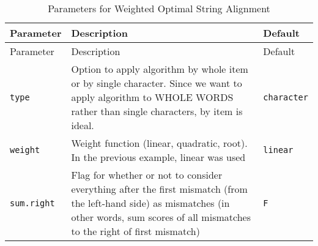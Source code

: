 \documentclass[]{article}
\begin{document}
\begin{longtable}[]{@{}lll@{}}
\caption{Parameters for Weighted Optimal String
Alignment}\tabularnewline
\toprule
\begin{minipage}[b]{0.15\columnwidth}\raggedright\strut
Parameter\strut
\end{minipage} & \begin{minipage}[b]{0.58\columnwidth}\raggedright\strut
Description\strut
\end{minipage} & \begin{minipage}[b]{0.15\columnwidth}\raggedright\strut
Default\strut
\end{minipage}\tabularnewline
\midrule
\endfirsthead
\toprule
\begin{minipage}[b]{0.15\columnwidth}\raggedright\strut
Parameter\strut
\end{minipage} & \begin{minipage}[b]{0.58\columnwidth}\raggedright\strut
Description\strut
\end{minipage} & \begin{minipage}[b]{0.15\columnwidth}\raggedright\strut
Default\strut
\end{minipage}\tabularnewline
\midrule
\endhead
\begin{minipage}[t]{0.15\columnwidth}\raggedright\strut
\texttt{type}\strut
\end{minipage} & \begin{minipage}[t]{0.58\columnwidth}\raggedright\strut
Option to apply algorithm by whole item or by single character. Since we
want to apply algorithm to WHOLE WORDS rather than single characters, by
item is ideal.\strut
\end{minipage} & \begin{minipage}[t]{0.15\columnwidth}\raggedright\strut
\texttt{character}\strut
\end{minipage}\tabularnewline
\begin{minipage}[t]{0.15\columnwidth}\raggedright\strut
\texttt{weight}\strut
\end{minipage} & \begin{minipage}[t]{0.58\columnwidth}\raggedright\strut
Weight function (linear, quadratic, root). In the previous example,
linear was used\strut
\end{minipage} & \begin{minipage}[t]{0.15\columnwidth}\raggedright\strut
\texttt{linear}\strut
\end{minipage}\tabularnewline
\begin{minipage}[t]{0.15\columnwidth}\raggedright\strut
\texttt{sum.right}\strut
\end{minipage} & \begin{minipage}[t]{0.58\columnwidth}\raggedright\strut
Flag for whether or not to consider everything after the first mismatch
(from the left-hand side) as mismatches (in other words, sum scores of
all mismatches to the right of first mismatch)\strut
\end{minipage} & \begin{minipage}[t]{0.15\columnwidth}\raggedright\strut
\texttt{F}\strut
\end{minipage}\tabularnewline
\bottomrule
\end{longtable}
\end{document}
